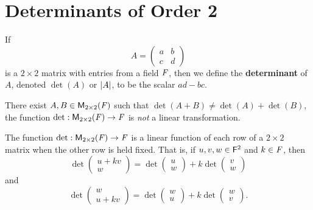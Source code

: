 \section{Determinants of Order \textrm{2}}\label{sec:4.1}

\begin{defn}\label{4.1.1}
	If
	\[
		A = \begin{pmatrix}
			a & b \\
			c & d
		\end{pmatrix}
	\]
	is a \(2 \times 2\) matrix with entries from a field \(\mathit{F}\), then we define the \textbf{determinant} of \(A\), denoted \(\det(A)\) or \(\left\lvert A\right\rvert\), to be the scalar \(ad - bc\).
\end{defn}

\begin{note}
	There exist \(A, B \in \ms[2][2][\F]\) such that \(\det(A + B) \neq \det(A) + \det(B)\), the function \(\det : \ms[2][2][\F] \to \F\) is \emph{not} a linear transformation.
\end{note}

\begin{thm}\label{4.1}
	The function \(\det : \ms[2][2][\F] \to \F\) is a linear function of each row of a \(2 \times 2\) matrix when the other row is held fixed.
	That is, if \(u, v, w \in \mathsf{F}^2\) and \(k \in \mathit{F}\), then
	\[
		\det\begin{pmatrix}
			u + kv \\
			w
		\end{pmatrix} = \det\begin{pmatrix}
			u \\
			w
		\end{pmatrix} + k \det\begin{pmatrix}
			v \\
			w
		\end{pmatrix}
	\]
	and
	\[
		\det\begin{pmatrix}
			w \\
			u + kv
		\end{pmatrix} = \det\begin{pmatrix}
			w \\
			u
		\end{pmatrix} + k \det\begin{pmatrix}
			w \\
			v
		\end{pmatrix}.
	\]
\end{thm}

